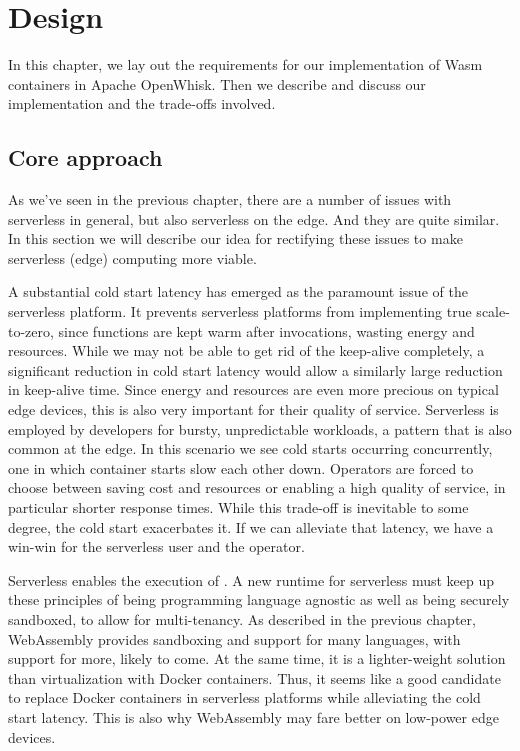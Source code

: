 \chapter{Design}
\label{chapter:design}

In this chapter, we lay out the requirements for our implementation of Wasm containers in Apache OpenWhisk. Then we describe and discuss our implementation and the trade-offs involved.

\section{Core approach}

As we've seen in the previous chapter, there are a number of issues with serverless in general, but also serverless on the edge. And they are quite similar. In this section we will describe our idea for rectifying these issues to make serverless (edge) computing more viable.

A substantial cold start latency has emerged as the paramount issue of the serverless platform. It prevents serverless platforms from implementing true scale-to-zero, since functions are kept warm after invocations, wasting energy and resources. While we may not be able to get rid of the keep-alive completely, a significant reduction in cold start latency would allow a similarly large reduction in keep-alive time. Since energy and resources are even more precious on typical edge devices, this is also very important for their quality of service.
Serverless is employed by developers for bursty, unpredictable workloads, a pattern that is also common at the edge. In this scenario we see cold starts occurring concurrently, one in which container starts slow each other down.
Operators are forced to choose between saving cost and resources or enabling a high quality of service, in particular shorter response times. While this trade-off is inevitable to some degree, the cold start exacerbates it. If we can alleviate that latency, we have a win-win for the serverless user and the operator.

Serverless enables the execution of  \cite{Nastic2018}. A new runtime for serverless must keep up these principles of being programming language agnostic as well as being securely sandboxed, to allow for multi-tenancy. As described in the previous chapter, WebAssembly provides sandboxing and support for many languages, with support for more, likely to come. At the same time, it is a lighter-weight solution than virtualization with Docker containers. Thus, it seems like a good candidate to replace Docker containers in serverless platforms while alleviating the cold start latency. This is also why WebAssembly may fare better on low-power edge devices.

